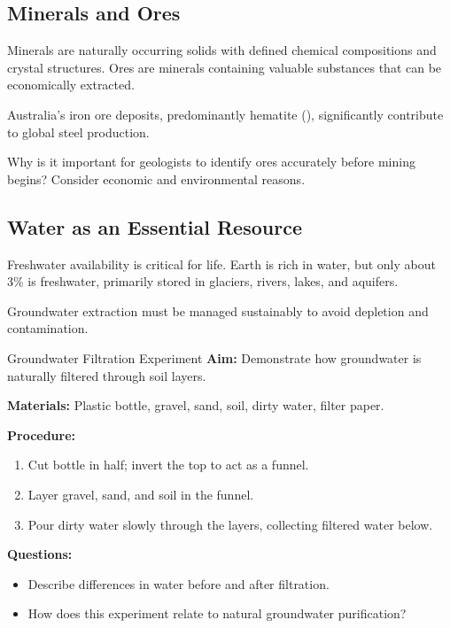 \subsection{Minerals and Ores}

Minerals are naturally occurring solids with defined chemical compositions and crystal structures. Ores are minerals containing valuable substances that can be economically extracted.


\begin{example}
Australia's iron ore deposits, predominantly hematite (), significantly contribute to global steel production.
\end{example}

\begin{stopandthink}
Why is it important for geologists to identify ores accurately before mining begins? Consider economic and environmental reasons.
\end{stopandthink}

\subsection{Water as an Essential Resource}

Freshwater availability is critical for life. Earth is rich in water, but only about 3\% is freshwater, primarily stored in glaciers, rivers, lakes, and aquifers.


Groundwater extraction must be managed sustainably to avoid depletion and contamination.

\begin{investigation}{Groundwater Filtration Experiment}
\textbf{Aim:} Demonstrate how groundwater is naturally filtered through soil layers.

\textbf{Materials:} Plastic bottle, gravel, sand, soil, dirty water, filter paper.

\textbf{Procedure:}
\begin{enumerate}
    \item Cut bottle in half; invert the top to act as a funnel.
    \item Layer gravel, sand, and soil in the funnel.
    \item Pour dirty water slowly through the layers, collecting filtered water below.
\end{enumerate}

\textbf{Questions:}
\begin{itemize}
    \item Describe differences in water before and after filtration.
    \item How does this experiment relate to natural groundwater purification?
\end{itemize}
\end{investigation}

